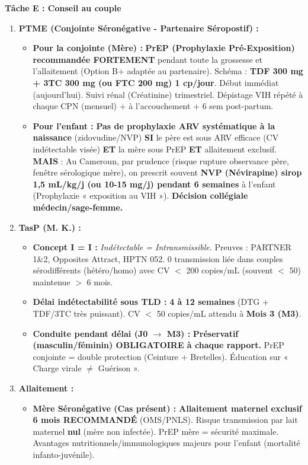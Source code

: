 \documentclass[11pt]{article}
\begin{document}
\begin{exoresolu}
\noindent\textbf{Tâche E : Conseil au couple}
\begin{enumerate}
    \item \textbf{PTME (Conjointe Séronégative - Partenaire Séropostif) :}
    \begin{itemize}
        \item \textbf{Pour la conjointe (Mère) :} \textbf{PrEP (Prophylaxie Pré-Exposition) recommandée FORTEMENT} pendant toute la grossesse et l'allaitement (Option B+ adaptée au partenaire). Schéma : \textbf{TDF 300 mg + 3TC 300 mg (ou FTC 200 mg) 1 cp/jour}. Début immédiat (aujourd'hui). Suivi rénal (Créatinine) trimestriel. Dépistage VIH répété à chaque CPN (mensuel) + à l'accouchement + 6 sem post-partum.
        \item \textbf{Pour l'enfant :} \textbf{Pas de prophylaxie ARV systématique à la naissance} (zidovudine/NVP) \textbf{SI} le père est sous ARV efficace (CV indétectable visée) \textbf{ET} la mère sous PrEP \textbf{ET} allaitement exclusif. \textbf{MAIS} : Au Cameroun, par prudence (risque rupture observance père, fenêtre sérologique mère), on prescrit souvent \textbf{NVP (Névirapine) sirop 1,5 mL/kg/j (ou 10-15 mg/j) pendant 6 semaines} à l'enfant (Prophylaxie « exposition au VIH »). \textbf{Décision collégiale médecin/sage-femme.}
    \end{itemize}
    \item \textbf{TasP (M. K.) :}
    \begin{itemize}
        \item \textbf{Concept I = I :} \emph{Indétectable = Intransmissible}. Preuves : PARTNER 1\&2, Opposites Attract, HPTN 052. 0 transmission liée dans couples sérodifférents (hétéro/homo) avec CV $<$ 200 copies/mL (souvent $<$ 50) maintenue $>$ 6 mois.
        \item \textbf{Délai indétectabilité sous TLD :} \textbf{4 à 12 semaines} (DTG + TDF/3TC très puissant). CV $<$ 50 copies/mL attendu à \textbf{Mois 3 (M3)}.
        \item \textbf{Conduite pendant délai (J0 $\rightarrow$ M3) :} \textbf{Préservatif (masculin/féminin) OBLIGATOIRE à chaque rapport.} PrEP conjointe = double protection (Ceinture + Bretelles). Éducation sur « Charge virale $\neq$ Guérison ».
    \end{itemize}
    \item \textbf{Allaitement :}
    \begin{itemize}
        \item \textbf{Mère Séronégative (Cas présent) :} \textbf{Allaitement maternel exclusif 6 mois RECOMMANDÉ} (OMS/PNLS). Risque transmission par lait maternel \textbf{nul} (mère non infectée). PrEP mère = sécurité maximale. Avantages nutritionnels/immunologiques majeurs pour l'enfant (mortalité infanto-juvénile).

\end{itemize}
\end{enumerate}
\end{exoresolu}
\end{document}
